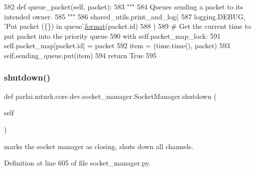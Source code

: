 \begin{DoxyCode}
582     \textcolor{keyword}{def }queue\_packet(self, packet):
583         \textcolor{stringliteral}{"""}
584 \textcolor{stringliteral}{        Queues sending a packet to its intended owner.}
585 \textcolor{stringliteral}{        """}
586         shared\_utils.print\_and\_log(
587             logging.DEBUG, \textcolor{stringliteral}{'Put packet (\{\}) in queue'}.\hyperlink{namespaceparlai_1_1chat__service_1_1services_1_1messenger_1_1shared__utils_a32e2e2022b824fbaf80c747160b52a76}{format}(packet.id)
588         )
589         \textcolor{comment}{# Get the current time to put packet into the priority queue}
590         with self.packet\_map\_lock:
591             self.packet\_map[packet.id] = packet
592         item = (time.time(), packet)
593         self.sending\_queue.put(item)
594         \textcolor{keywordflow}{return} \textcolor{keyword}{True}
595 
\end{DoxyCode}
\mbox{\label{classparlai_1_1mturk_1_1core_1_1dev_1_1socket__manager_1_1SocketManager_a708d0e46408b9a7259903f8896d1902b}} 
\subsubsection{\texorpdfstring{shutdown()}{shutdown()}}
{\footnotesize\ttfamily def parlai.\+mturk.\+core.\+dev.\+socket\+\_\+manager.\+Socket\+Manager.\+shutdown (\begin{DoxyParamCaption}\item[{}]{self }\end{DoxyParamCaption})}

\begin{DoxyVerb}marks the socket manager as closing, shuts down all channels.
\end{DoxyVerb}
 

Definition at line 605 of file socket\+\_\+manager.\+py.


